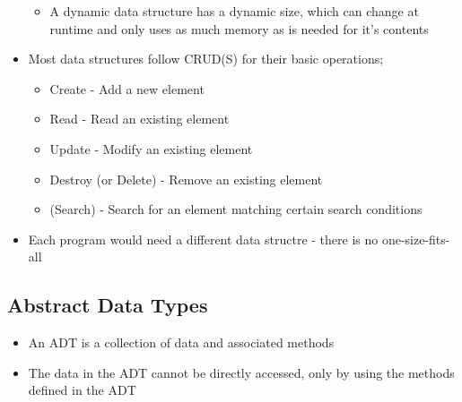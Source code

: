 \begin{itemize}
\begin{itemize}
    \item A dynamic data structure has a dynamic size, which can change at runtime and only uses as much memory as is needed for it's contents
  \end{itemize}
  \item Most data structures follow CRUD(S) for their basic operations;
  \begin{itemize}
    \item Create - Add a new element
    \item Read - Read an existing element
    \item Update - Modify an existing element
    \item Destroy (or Delete) - Remove an existing element
    \item (Search) - Search for an element matching certain search conditions
  \end{itemize}
  \item Each program would need a different data structre - there is no one-size-fits-all
\end{itemize}

\subsection*{Abstract Data Types}

\begin{itemize}
  \item An ADT is a collection of data and associated methods
  \item The data in the ADT cannot be directly accessed, only by using the methods defined in the ADT
\end{itemize}

